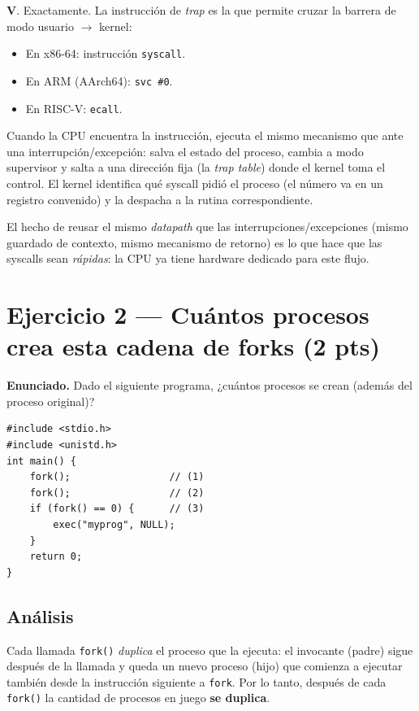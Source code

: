 \documentclass[11pt,a4paper]{article}
\begin{document}
\begin{respuesta}
\textbf{V}. Exactamente. La instrucción de \emph{trap} es la que
permite cruzar la barrera de modo usuario $\to$ kernel:

\begin{itemize}[leftmargin=*,nosep]
    \item En x86-64: instrucción \texttt{syscall}.
    \item En ARM (AArch64): \texttt{svc \#0}.
    \item En RISC-V: \texttt{ecall}.
\end{itemize}

Cuando la CPU encuentra la instrucción, ejecuta el mismo mecanismo
que ante una interrupción/excepción: salva el estado del proceso,
cambia a modo supervisor y salta a una dirección fija (la
\emph{trap table}) donde el kernel toma el control. El kernel
identifica qué syscall pidió el proceso (el número va en un
registro convenido) y la despacha a la rutina correspondiente.

El hecho de reusar el mismo \emph{datapath} que las
interrupciones/excepciones (mismo guardado de contexto, mismo
mecanismo de retorno) es lo que hace que las syscalls sean
\emph{rápidas}: la CPU ya tiene hardware dedicado para este flujo.
\end{respuesta}

\section{Ejercicio 2 --- Cuántos procesos crea esta cadena de forks (2 pts)}

\textbf{Enunciado.} Dado el siguiente programa, ¿cuántos procesos se
crean (además del proceso original)?

\begin{lstlisting}[style=cstyle]
#include <stdio.h>
#include <unistd.h>
int main() {
    fork();                 // (1)
    fork();                 // (2)
    if (fork() == 0) {      // (3)
        exec("myprog", NULL);
    }
    return 0;
}
\end{lstlisting}

\subsection*{Análisis}

Cada llamada \texttt{fork()} \emph{duplica} el proceso que la
ejecuta: el invocante (padre) sigue después de la llamada y queda un
nuevo proceso (hijo) que comienza a ejecutar también desde la
instrucción siguiente a \texttt{fork}. Por lo tanto, después de cada
\texttt{fork()} la cantidad de procesos en juego \textbf{se duplica}.
\end{document}
